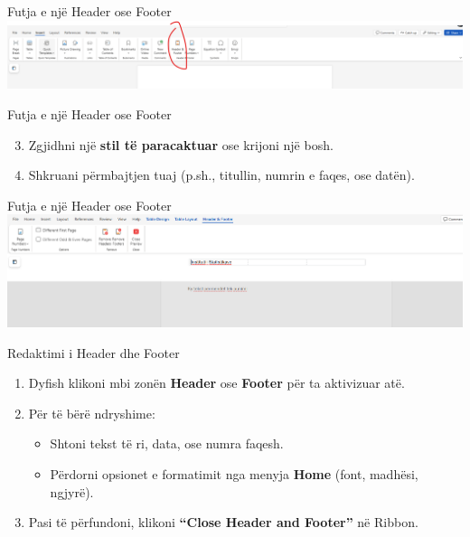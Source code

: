 \documentclass[
  ignorenonframetext,
]{beamer}
\begin{document}
\begin{frame}{Futja e një Header ose Footer}
\label{futja-e-njuxeb-header-ose-footer-1}
\includegraphics{./images/word16.png}
\end{frame}

\begin{frame}{Futja e një Header ose Footer}
\label{futja-e-njuxeb-header-ose-footer-2}
\begin{enumerate}
\setcounter{enumi}{2}
\item
  Zgjidhni një \textbf{stil të paracaktuar} ose krijoni një bosh.
\item
  Shkruani përmbajtjen tuaj (p.sh., titullin, numrin e faqes, ose
  datën).
\end{enumerate}
\end{frame}

\begin{frame}{Futja e një Header ose Footer}
\label{futja-e-njuxeb-header-ose-footer-3}
\includegraphics{./images/word17.png}
\end{frame}

\begin{frame}{Redaktimi i Header dhe Footer}
\label{redaktimi-i-header-dhe-footer}
\begin{enumerate}
\item
  Dyfish klikoni mbi zonën \textbf{Header} ose \textbf{Footer} për ta
  aktivizuar atë.
\item
  Për të bërë ndryshime:

  \begin{itemize}
  \item
    Shtoni tekst të ri, data, ose numra faqesh.
  \item
    Përdorni opsionet e formatimit nga menyja \textbf{Home} (font,
    madhësi, ngjyrë).
  \end{itemize}
\item
  Pasi të përfundoni, klikoni \textbf{``Close Header and Footer''} në
  Ribbon.
\end{enumerate}
\end{frame}
\end{document}
